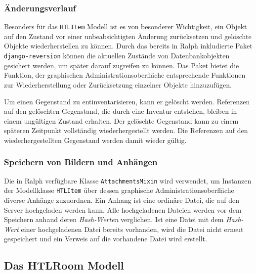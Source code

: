 \hypertarget{uxe4nderungsverlauf}{%
\subsubsection{Änderungsverlauf}\label{uxe4nderungsverlauf}}

Besonders für das \texttt{HTLItem} Modell ist es von besonderer
Wichtigkeit, ein Objekt auf den Zustand vor einer unbeabsichtigten
Änderung zurücksetzen und gelöschte Objekte wiederherstellen zu können.
Durch das bereits in Ralph inkludierte Paket \texttt{django-reversion}
können die aktuellen Zustände von Datenbankobjekten gesichert werden, um
später darauf zugreifen zu können. \cite{django-reversion-doku} Das
Paket bietet die Funktion, der graphischen Administrationsoberfläche
entsprechende Funktionen zur Wiederherstellung oder Zurücksetzung
einzelner Objekte hinzuzufügen.

Um einen Gegenstand zu entinventarisieren, kann er gelöscht werden.
Referenzen auf den gelöschten Gegenstand, die durch eine Inventur
entstehen, bleiben in einem ungültigen Zustand erhalten. Der gelöschte
Gegenstand kann zu einem späteren Zeitpunkt vollständig
wiederhergestellt werden. Die Referenzen auf den wiederhergestellten
Gegenstand werden damit wieder gültig.

\hypertarget{speichern-von-bildern-und-anhuxe4ngen}{%
\subsubsection{Speichern von Bildern und
Anhängen}\label{speichern-von-bildern-und-anhuxe4ngen}}

Die in Ralph verfügbare Klasse \texttt{AttachmentsMixin} wird verwendet,
um Instanzen der Modellklasse \texttt{HTLItem} über dessen graphische
Administrationsoberfläche diverse Anhänge zuzuordnen. Ein Anhang ist
eine ordinäre Datei, die auf den Server hochgeladen werden kann. Alle
hochgeladenen Dateien werden vor dem Speichern anhand deren
\emph{Hash-Werten}
verglichen. Ist eine Datei mit dem
\emph{Hash-Wert}
einer hochgeladenen Datei bereits vorhanden, wird die Datei nicht erneut
gespeichert und ein Verweis auf die vorhandene Datei wird erstellt.

\hypertarget{das-htlroom-modell}{%
\subsection{Das HTLRoom Modell}\label{das-htlroom-modell}}

